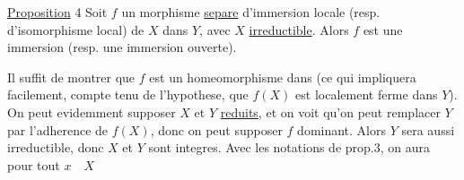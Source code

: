 \uline{Proposition} 4 Soit $f$ un morphisme \uline{separe} d'immersion locale (resp. d'isomorphisme local) de $X$ dans $Y$, avec  $X$ \uline{irreductible}. Alors $f$ est une immersion (resp. une immersion ouverte).

Il suffit de montrer que $f$ est un homeomorphisme dans (ce qui impliquera facilement, compte tenu de l'hypothese, que $f(X)$ est localement ferme dans $Y$). On peut evidemment supposer $X$ et $Y$ \uline{reduits}, et on voit qu'on peut remplacer $Y$ par l'adherence de $f(X)$, donc on peut supposer $f$ dominant. Alors  $Y$ sera aussi irreductible, donc $X$ et $Y$ sont integres. Avec les notations de prop.3, on aura pour tout $x\quad X$
